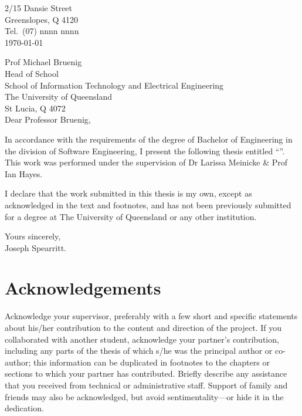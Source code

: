 
\cleardoublepage

\begin{flushright}
	2/15 Dansie Street\\
	Greenslopes, Q 4120\\
	Tel.\ (07) nnnn nnnn\\
	\medskip
	\today
\end{flushright}
\begin{flushleft}
	Prof Michael Bruenig\\
	Head of School\\
	School of Information Technology and Electrical Engineering\\
	The University of Queensland\\
	St Lucia, Q 4072\\
	\bigskip\bigskip
	Dear Professor Bruenig,
\end{flushleft}

In accordance with the requirements of the degree of Bachelor of Engineering in the division of Software Engineering, I present the following thesis entitled ``\thetitle''. This work was performed under the supervision of Dr Larissa Meinicke \& Prof Ian Hayes.

I declare that the work submitted in this thesis is my own, except as
acknowledged in the text and footnotes, and has not been previously
submitted for a degree at The University of Queensland or any other
institution.
\newline
\begin{flushright}
	Yours sincerely,\\
	\medskip
	$ \; $\vspace*{5mm}\\
	\medskip
	Joseph Spearritt.
\end{flushright}

\cleardoublepage

\chapter{Acknowledgements}

Acknowledge your supervisor, preferably with a few short and specific
statements about his/her contribution to the content and direction of
the project.  If you collaborated with another student, acknowledge
your partner's contribution, including any parts of the thesis of
which s/he was the principal author or co-author; this information can
be duplicated in footnotes to the chapters or sections to which your
partner has contributed.  Briefly describe any assistance that you
received from technical or administrative staff.  Support of family
and friends may also be acknowledged, but avoid sentimentality---or
hide it in the dedication.

